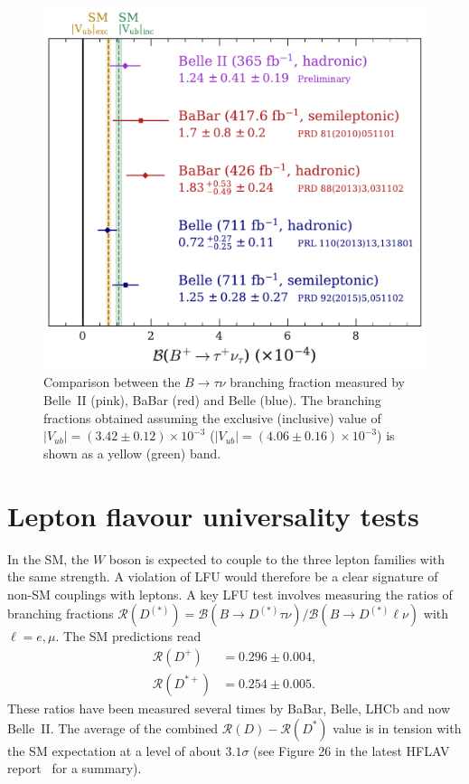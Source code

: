 \documentclass{moriond}
\def\bea{\begin{eqnarray}}
\def\eea{\end{eqnarray}}
\def\vub{V_{ub}}
\def\rd{\mathcal{R}\left(D\right)}
\def\rdp{\mathcal{R}\left(D^+\right)}
\def\rdst{\mathcal{R}\left(D^*\right)}
\def\rdstp{\mathcal{R}\left(D^{*+}\right)}
\def\rddst{\mathcal{R}\left(D^{(*)}\right)}
\begin{document}
\begin{figure}[h!]
    \centering
    \includegraphics[scale=0.4]{Figures/Final_Unblinding_.pdf}
    \caption{Comparison between the $B \to \tau\nu$ branching fraction measured by Belle~II (pink), BaBar (red) and Belle (blue). The branching fractions obtained assuming the exclusive (inclusive) value of $|\vub| = (3.42 \pm 0.12)\times 10^{-3}$ ($|\vub| = (4.06 \pm 0.16)\times 10^{-3}$) is shown as a yellow (green) band.}
    \label{fig:Final_Unblinding_}
\end{figure}

\section{Lepton flavour universality tests}
In the SM, the $W$ boson is expected to couple to the three lepton families with the same strength. A violation of LFU would therefore be a clear signature of non-SM couplings with leptons. A key LFU test involves measuring the ratios of branching fractions $\rddst = \mathcal{B}(B \to D^{(*)}\tau\nu)/\mathcal{B}(B \to D^{(*)}\ell\nu)$ with $\ell=e,\mu$. The SM predictions read
\bea
    \rdp &= 0.296 \pm 0.004, \\
    \rdstp &= 0.254 \pm 0.005.
\eea
These ratios have been measured several times by BaBar, Belle, LHCb and now Belle~II. The average of the combined $\rd-\rdst$ value is in tension with the SM expectation at a level of about $3.1\sigma$ (see Figure 26 in the latest HFLAV report~\cite{hflav} for a summary).
\end{document}
